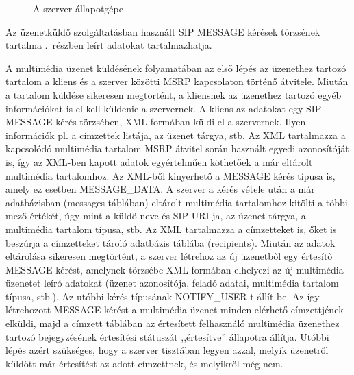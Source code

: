 \begin{figure}[htbp]
\center
{}
\caption{A szerver állapotgépe}
\label{fig:server_statemachine_message}
\end{figure}

Az üzenetküldő szolgáltatásban használt SIP MESSAGE kérések törzsének tartalma .~részben leírt adatokat tartalmazhatja.

A multimédia üzenet küldésének folyamatában az első lépés az üzenethez tartozó tartalom a kliens és a szerver közötti MSRP kapcsolaton történő átvitele. Miután a tartalom küldése sikeresen megtörtént, a kliensnek az üzenethez tartozó egyéb információkat is el kell küldenie a szervernek. A kliens az adatokat egy SIP MESSAGE kérés törzsében, XML formában küldi el a szervernek. Ilyen információk pl. a címzettek listája, az üzenet tárgya, stb. Az XML tartalmazza a kapcsolódó multimédia tartalom MSRP átvitel során használt egyedi azonosítóját is, így az XML-ben kapott adatok egyértelműen köthetőek a már eltárolt multimédia tartalomhoz.  Az XML-ből kinyerhető a MESSAGE kérés típusa is, amely ez esetben MESSAGE\_DATA. A szerver a kérés vétele után a már adatbázisban (messages táblában) eltárolt multimédia tartalomhoz kitölti a többi mező értékét, úgy mint a küldő neve és SIP URI-ja, az üzenet tárgya, a multimédia tartalom típusa, stb. Az XML tartalmazza a címzetteket is, őket is beszúrja a címzetteket tároló adatbázis táblába (recipients). Miután az adatok eltárolása sikeresen megtörtént, a szerver létrehoz az új üzenetből egy értesítő MESSAGE kérést, amelynek törzsébe XML formában elhelyezi az új multimédia üzenetet leíró adatokat (üzenet azonosítója, feladó adatai, multimédia tartalom típusa, stb.). Az utóbbi kérés típusának NOTIFY\_USER-t állít be. Az így létrehozott MESSAGE kérést a multimédia üzenet minden elérhető címzettjének elküldi, majd a címzett táblában az értesített felhasználó multimédia üzenethez tartozó bejegyzésének értesítési státuszát ,,értesítve'' állapotra állítja. Utóbbi lépés azért szükséges, hogy a szerver tisztában legyen azzal, melyik üzenetről küldött már értesítést az adott címzettnek, és melyikről még nem.

